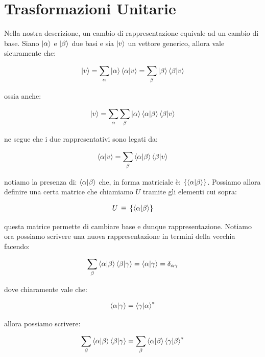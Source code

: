 \section{Trasformazioni Unitarie}
	
	Nella nostra descrizione, un cambio di rappresentazione equivale ad un cambio di base. Siano $\ket{\alpha}$ e $\ket{\beta}$ due basi e sia $\ket{v}$ un vettore generico, allora vale sicuramente che:
	
\begin{align*}
	\ket{v} = \sum_{\alpha} \ket{\alpha} \braket{\alpha}{v} = \sum_{\beta} \ket{\beta} \braket{\beta}{v}
\end{align*}
	
	ossia anche:
	
\begin{align*}
	\ket{v} = \sum_{\alpha}  \sum_{\beta} \ket{\alpha} \braket{\alpha}{\beta} \braket{\beta}{v}
\end{align*}

	ne segue che i due rappresentativi sono legati da:
	
\begin{align*}
	\braket{\alpha}{v} = \sum_{\beta} \braket{\alpha}{\beta} \braket{\beta}{v}
\end{align*}

	notiamo la presenza di: $ \braket{\alpha}{\beta}$ che, in forma matriciale è: $\{ \braket{\alpha}{\beta} \}$. Possiamo allora definire una certa matrice che chiamiamo $U$ tramite gli elementi cui sopra:

\begin{align*}
	U \, \equiv \, \{ \braket{\alpha}{\beta} \}
\end{align*}

	questa matrice permette di cambiare base e dunque rappresentazione. Notiamo ora possiamo scrivere una nuova rappresentazione in termini della vecchia facendo:
	
\begin{align*}
	\sum_{\beta} \braket{\alpha}{\beta} \braket{\beta}{\gamma} = \braket{\alpha}{\gamma} = \delta_{\alpha \gamma}
\end{align*}

	dove chiaramente vale che:
	
\begin{align*}
	\braket{\alpha}{\gamma} = \braket{\gamma}{\alpha}^*
\end{align*}

	allora possiamo scrivere:

\begin{align*}
	\sum_{\beta} \braket{\alpha}{\beta} \braket{\beta}{\gamma} = \sum_{\beta} \braket{\alpha}{\beta} \braket{\gamma}{\beta}^*
\end{align*}

